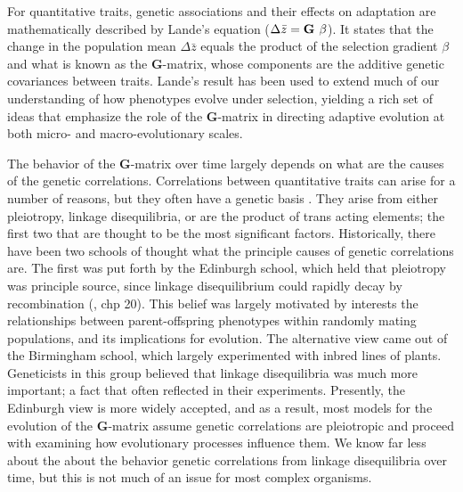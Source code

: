 \documentclass[9pt,twocolumn,twoside]{gsajnl}
\begin{document}
For quantitative traits, genetic associations and their effects on adaptation are mathematically described by Lande's equation ($\Delta \bar{z} = \textbf{G} \hspace{.05in}\beta$). It states that the change in the population mean $\Delta \bar{z}$ equals the product of the selection gradient $\beta$ and what is known as the \textbf{G}-matrix, whose components are the additive genetic covariances between traits. Lande’s result has been used to extend much of our understanding of how phenotypes evolve under selection, yielding a rich set of ideas that emphasize the role of the \textbf{G}-matrix in directing adaptive evolution at both micro- and macro-evolutionary scales.\par
% 
% 

The behavior of the \textbf{G}-matrix over time largely depends on what are the causes of the genetic correlations. Correlations between quantitative traits can arise for a number of reasons, but they often have a genetic basis \citep{Saltz2017}. They arise from either pleiotropy, linkage disequilibria, or are the product of trans acting elements; the first two that are thought to be the most significant factors. Historically, there have been two schools of thought what the principle causes of genetic correlations are. The first was put forth by the Edinburgh school, which held that pleiotropy was principle source, since linkage disequilibrium could rapidly decay by recombination (\citep{fox2006evolutionary}, chp 20). This belief was largely motivated by interests the relationships between parent-offspring phenotypes within randomly mating populations, and its implications for evolution. The alternative view came out of the Birmingham school, which largely experimented with inbred lines of plants. Geneticists in this group believed that linkage disequilibria was much more important; a fact that often reflected in their experiments. Presently, the Edinburgh view is more widely accepted, and as a result, most models for the evolution of the \textbf{G}-matrix assume genetic correlations are pleiotropic and proceed with examining how evolutionary processes influence them. We know far less about the about the behavior genetic correlations from linkage disequilibria over time, but this is not much of an issue for most complex organisms.\par
\end{document}
